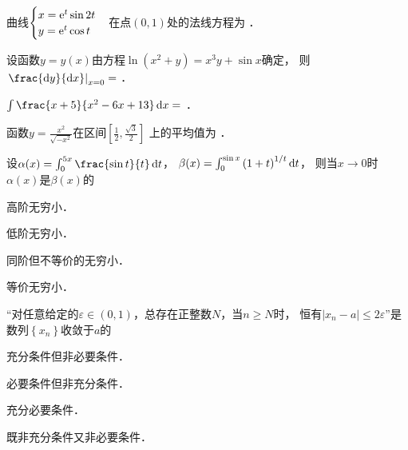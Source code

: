 \documentclass[plain,noanswer,medmath]{../../template/jnuexam}
\begin{document}






\begin{problem}
曲线$\begin{cases}
  x = \mathrm{e}^t\sin 2t \\
  y = \mathrm{e}^t\cos t \\
\end{cases}$在点$(0,1)$处的法线方程为 \fillin{}．
\end{problem}


\begin{problem}
设函数$y = y(x)$由方程$\ln \left(x^2 + y \right) = x^3 y + \sin x$确定，
则$\left. \frac{\dy}{\dx} \right|_{x = 0} =$ \fillin{}．
\end{problem}


\begin{problem}
$\int \frac{x + 5}{x^2 - 6x + 13} \dx =$ \fillin{}．
\end{problem}


\begin{problem}
函数$y = \frac{x^2}{\sqrt{- x^2}}$在区间$\left[\frac{1}{2},\frac{\sqrt{3}}{2} \right]$
上的平均值为 \fillin{}．
\end{problem}








\begin{problem}
设$\alpha (x) = \int_0^{5x} \frac{\sin t}{t}\dt$，
$\beta (x) = \int_0^{\sin x} \left(1 + t \right)^{1/t} \mathop{}\!\mathrm{d} t$，
则当$x \to 0$时$\alpha (x)$是$\beta (x)$的\pickout{}
\begin{abcd}
\item 高阶无穷小．
\item 低阶无穷小．
\item 同阶但不等价的无穷小．
\item 等价无穷小．
\end{abcd}
\end{problem}




\begin{problem}
“对任意给定的$\varepsilon \in \left(0, 1 \right)$，总存在正整数$N$，当$n \ge N$时，
恒有$\left| x_n - a \right| \le 2\varepsilon$”是数列$\left\{x_n \right\}$收敛于$a$的\pickout{}
\begin{abcd}
\item 充分条件但非必要条件．
\item 必要条件但非充分条件．
\item 充分必要条件．
\item 既非充分条件又非必要条件．
\end{abcd}
\end{problem}
\end{document}
